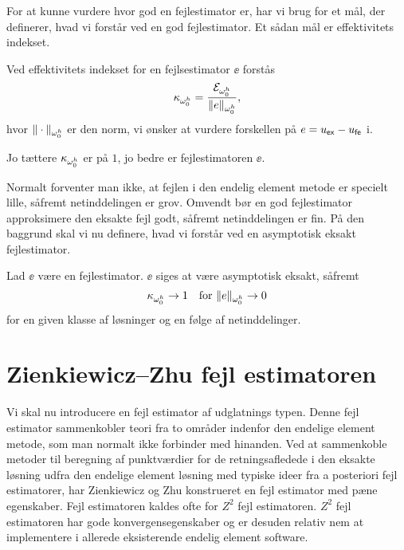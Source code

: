 For at kunne vurdere hvor god en fejlestimator er, har vi brug for et
mål, der definerer, hvad vi forstår ved en god fejlestimator. Et sådan
mål er effektivitets indekset.

\begin{definition}
Ved effektivitets indekset for en fejlsestimator $\ee$ forstås
\begin{equation}
  \kappa_{\omega_{0}^{h}} = \frac{{\mathcal{E}}_{\omega_{0}^{h}}}{\|e\|_{\omega_{0}^{h}}},
\end{equation}
hvor $\|\cdot\|_{\omega_{0}^{h}}$ er den norm, vi ønsker at vurdere forskellen på
$e=u_{\mathsf{ex}} - u_{\mathsf{fe}}$ i.
\end{definition}

Jo tættere $\kappa_{\omega_{0}^{h}}$ er på $1$, jo bedre er fejlestimatoren $\ee$.

Normalt forventer man ikke, at fejlen i den endelig element metode er
specielt lille, såfremt netinddelingen er grov. Omvendt bør en god
fejlestimator approksimere den eksakte fejl godt, såfremt
netinddelingen er fin. På den baggrund skal vi nu definere, hvad vi
forstår ved en asymptotisk eksakt fejlestimator.
\begin{definition} \label{asympexact}
Lad $\ee$ være en fejlestimator. $\ee$ siges at være asymptotisk
eksakt, såfremt
\begin{equation}
  \kappa_{\omega_{0}^{h}} \rightarrow 1 \quad \text{for $\|e\|_{\omega_{0}^{h}}\rightarrow 0$}
\end{equation}
for en given klasse af løsninger og en følge af netinddelinger.
\end{definition}

\section{Zienkiewicz--Zhu fejl estimatoren} \label{z2}
Vi skal nu introducere en fejl estimator af udglatnings typen. Denne
fejl estimator sammenkobler teori fra to områder indenfor den endelige
element metode, som man normalt ikke forbinder med hinanden. Ved at
sammenkoble metoder til beregning af punktværdier for de
retningsafledede i den eksakte løsning udfra den endelige element
løsning med typiske ideer fra a posteriori fejl estimatorer,  har
Zienkiewicz og Zhu konstrueret en fejl estimator med pæne egenskaber.
Fejl estimatoren kaldes ofte for $Z^2$ fejl estimatoren. $Z^2$ fejl
estimatoren har gode konvergensegenskaber og er desuden relativ nem at
implementere i allerede eksisterende endelig element software.

